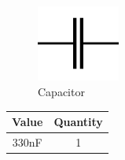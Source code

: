 \documentclass[10pt]{article}
\begin{document}
\begin{figure}[h]
\centering
\caption{Capacitor}
\label{Capacitor}
\includegraphics[height=2.5cm]{images/capacitor_diagram.jpg}
\end{figure}

\begin{center}
	\begin{tabular}{|c|c|}
		\hline
		Value & Quantity \\ \hline
		330nF & 1 \\ \hline
	\end{tabular}
\end{center}
\end{document}
